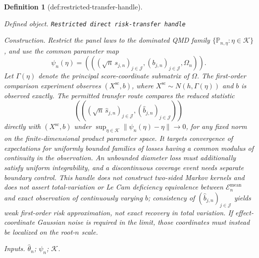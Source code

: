 \documentclass{article}
\newtheorem{definition}{Definition}
\begin{document}
\begin{definition}[def:restricted-transfer-handle]\label{def:restricted-transfer-handle}
\par\smallskip\noindent\emph{Defined object.} \texttt{Restricted direct risk-\allowbreak{}transfer handle}
\par\smallskip\noindent\emph{Construction.} Restrict the panel laws to the dominated QMD family \(\{\mathbb P_{n,\eta}:\eta\in\mathcal K\}\), and use the common parameter map
\[
 \psi_n(\eta)=
 \left(((\sqrt n\,s_{j,n})_{j\in\mathcal J},
        (b_{j,n})_{j\in\mathcal J},\Omega_n)\right).
\]
Let \(\Gamma(\eta)\) denote the principal score-coordinate submatrix of \(\Omega\). The first-order comparison experiment observes \((X^{\mathrm{sc}},b)\), where \(X^{\mathrm{sc}}\sim N(h,\Gamma(\eta))\) and \(b\) is observed exactly. The permitted transfer route compares the reduced statistic
\[
 \left(((\sqrt n\,\widehat s_{j,n})_{j\in\mathcal J},
        (\widehat b_{j,n})_{j\in\mathcal J})\right)
\]
directly with \((X^{\mathrm{sc}},b)\) under \(\sup_{\eta\in\mathcal K}\lVert\psi_n(\eta)-\eta\rVert\to0\), for any fixed norm on the finite-dimensional product parameter space. It targets convergence of expectations for uniformly bounded families of losses having a common modulus of continuity in the observation. An unbounded diameter loss must additionally satisfy uniform integrability, and a discontinuous coverage event needs separate boundary control. This handle does not construct two-sided Markov kernels and does not assert total-variation or Le Cam deficiency equivalence between \(\mathcal E_n^{\mathrm{mean}}\) and exact observation of continuously varying \(b\); consistency of \((\widehat b_{j,n})_{j\in\mathcal J}\) yields weak first-order risk approximation, not exact recovery in total variation. If effect-coordinate Gaussian noise is required in the limit, those coordinates must instead be localized on the root-\(n\) scale.
\par\smallskip\noindent\emph{Inputs.} \(\widehat\theta_n\); \(\psi_n\); \(\mathcal K\).
\end{definition}
\end{document}
